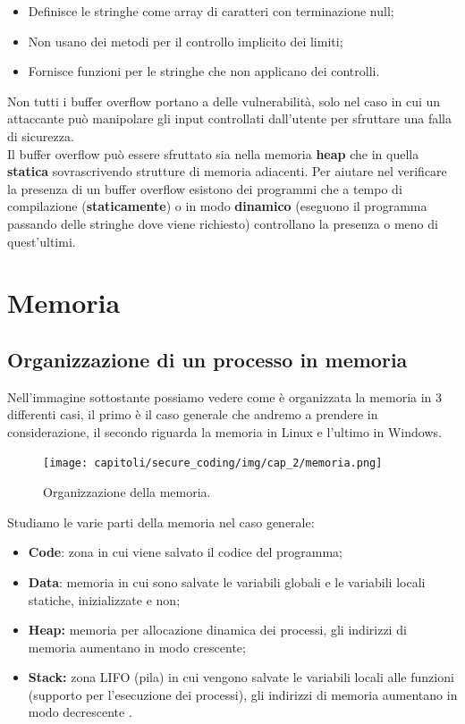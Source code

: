 \begin{itemize}
    \item Definisce le stringhe come array di caratteri con terminazione null;
    \item Non usano dei metodi per il controllo implicito dei limiti;
    \item Fornisce funzioni per le stringhe che non applicano dei controlli.
\end{itemize}

Non tutti i buffer overflow portano a delle vulnerabilità, solo nel caso in cui un
attaccante può manipolare gli input controllati dall'utente per sfruttare una
falla di sicurezza.\\
Il buffer overflow può essere sfruttato sia nella memoria \textbf{heap} che in
quella \textbf{statica} sovrascrivendo strutture di memoria adiacenti.
Per aiutare nel verificare la presenza di un buffer overflow esistono dei programmi
che a tempo di compilazione (\textbf{staticamente}) o in modo \textbf{dinamico}
(eseguono il programma passando delle stringhe dove viene richiesto) controllano la
presenza o meno di quest'ultimi.

\section{Memoria}

\subsection{Organizzazione di un processo in memoria}

Nell'immagine sottostante possiamo vedere come è organizzata la memoria in 3
differenti casi, il primo è il caso generale che andremo a prendere in considerazione,
il secondo riguarda la memoria in Linux e l'ultimo in Windows.

\begin{figure}[H]
    \centering
    \texttt{[image: capitoli/secure\_coding/img/cap\_2/memoria.png]}
    \caption{Organizzazione della memoria.}\label{fig:org_memoria}
\end{figure}

Studiamo le varie parti della memoria nel caso generale:

\begin{itemize}
    \item \textbf{Code}: zona in cui viene salvato il codice del programma;
    \item \textbf{Data}: memoria  in cui sono salvate le variabili globali e le
          variabili locali statiche, inizializzate e non;
    \item \textbf{Heap:} memoria per allocazione dinamica dei processi, gli indirizzi
          di memoria aumentano in modo crescente;
    \item \textbf{Stack:} zona LIFO (pila) in cui vengono salvate le variabili locali
          alle funzioni (supporto per l'esecuzione dei processi), gli indirizzi di memoria
          aumentano in modo decrescente .
\end{itemize}

